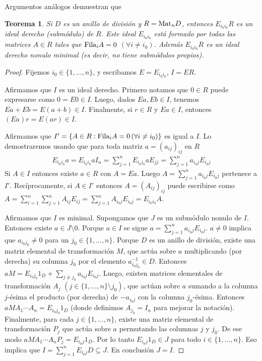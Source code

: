 \documentclass{report}
\newcommand{\Mat}{\textnormal{Mat}}
\newcommand{\Fila}{\textnormal{Fila}}
\newtheorem{theorem}{Teorema}
\begin{document}
  Argumentos análogos demuestran que
  \begin{theorem}
    Si \(D\) es un anillo de división y \(R = \Mat_n D\), entonces \(E_{i_0 i_0} R\) es un ideal derecho (submódulo) de \(R\).
    Este ideal \(E_{i_0 i_0}\) está formado por todas las matrices \(A \in R\) tales que \(\Fila_i A = 0\) \((\forall i \neq i_0)\).
    Además \(E_{i_0 i_0} R\) es un ideal derecho nonulo minimal (es decir, no tiene submódulos propios).
  \end{theorem}
  \begin{proof}
    Fijemos \(i_0 \in \{1, \dots, n\}\), y escribamos \(E = E_{i_0 i_0}\), \(I = E R\).

    Afirmamos que \(I\) es un ideal derecho.
    Primero notamos que \(0 \in R\) puede expresarse como \(0 = E 0 \in I\).
    Luego, dados \(E a, E b \in I\), tenemos \(E a + E b = E (a + b) \in I\).
    Finalmente, si \(r \in R\) y \(E a \in I\), entonces \((E a) r = E (a r) \in I\).

    Afirmamos que \(I' = \{A \in R : \Fila_i A = 0 \, (\forall i \neq i_0)\}\) es igual a \(I\).
    Lo demostraremos usando que para toda matriz \(a = (a_{i j})_{i j}\) en \(R\)
    \begin{align}
      E_{i_0 i_0} a
      =
      E_{i_0 i_0} a I_n
      =
      \sum_{j = 1}^n E_{i_0 i_0} a E_{j j}
      =
      \sum_{j = 1}^n a_{i_0 j} E_{i_0 j}
    \end{align}
    Si \(A \in I\) entonces existe \(a \in R\) con \(A = E a\).
    Luego \(A = \sum_{j = 1}^n a_{i_0 j} E_{i_0 j}\) pertenece a \(I'\).
    Recíprocamente, si \(A \in I'\) entonces \(A = (A_{i j})_{i j}\) puede escribirse como \(A = \sum_{i = 1}^n \sum_{j = 1}^n A_{i j} E_{i j} = \sum_{j = 1}^n A_{i_0 j} E_{i_0 j} = E_{i_0 i_0} A\).

    Afirmamos que \(I\) es minimal.
    Supongamos que \(J\) es un submódulo nonulo de \(I\).
    Entonces existe \(a \in J \setminus 0\).
    Porque \(a \in I\) se sigue \(a = \sum_{j = 1}^n a_{i_0 j} E_{i_0 j}\).
    \(a \neq 0\) implica que \(a_{i_0 j_0} \neq 0\) para un \(j_0 \in \{1, \dots, n\}\).
    Porque \(D\) es un anillo de división, existe una matriz elemental de transformación \(M\), que actúa sobre \(a\) multiplicando (por derecha) su columna \(j_0\) por el elemento \(a_{i_0 j_0}^{- 1} \in D\).
    Entonces \(a M = E_{i_0 j_0} 1_D + \sum_{j \neq j_0} a_{i_0 j} E_{i_0 j}\).
    Luego, existen matrices elementales de transformación \(A_j\) \((j \in \{1, \dots, n\} \setminus j_0)\), que actúan sobre \(a\) sumando a la columna \(j\)-ésima el producto (por derecha) de \(- a_{i_0 j}\) con la columna \(j_0\)-ésima.
    Entonces \(a M A_1 \cdots A_n = E_{i_0 j_0} 1_D\) (donde definimos \(A_{j_0} = I_n\) para mejorar la notación).
    Finalmente, para cada \(j \in \{1, \dots, n\}\), existe una matriz elemental de transformación \(P_j\) que actúa sobre \(a\) permutando las columnas \(j\) y \(j_0\).
    De ese modo \(a M A_1 \cdots A_n P_j = E_{i_0 j} 1_D\).
    Por lo tanto \(E_{i_0 j} 1_D \in J\) para todo \(i \in \{1, \dots, n\}\).
    Eso implica que \(I = \sum_{j = 1}^n E_{i_0 j} D \subseteq J\).
    En conclusión \(J = I\).
  \end{proof}
\end{document}

